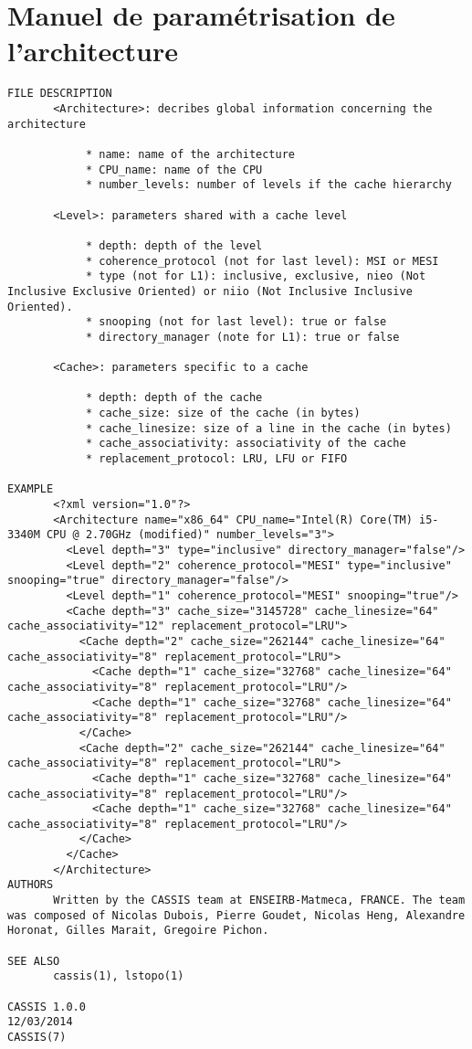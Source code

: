 \section{Manuel de paramétrisation de l'architecture}
\label{manarchi}
\begin{lstlisting}
FILE DESCRIPTION
       <Architecture>: decribes global information concerning the architecture

            * name: name of the architecture
            * CPU_name: name of the CPU
            * number_levels: number of levels if the cache hierarchy

       <Level>: parameters shared with a cache level

            * depth: depth of the level
            * coherence_protocol (not for last level): MSI or MESI
            * type (not for L1): inclusive, exclusive, nieo (Not Inclusive Exclusive Oriented) or niio (Not Inclusive Inclusive Oriented).
            * snooping (not for last level): true or false
            * directory_manager (note for L1): true or false

       <Cache>: parameters specific to a cache

            * depth: depth of the cache
            * cache_size: size of the cache (in bytes)
            * cache_linesize: size of a line in the cache (in bytes)
            * cache_associativity: associativity of the cache
            * replacement_protocol: LRU, LFU or FIFO

EXAMPLE
       <?xml version="1.0"?>
       <Architecture name="x86_64" CPU_name="Intel(R) Core(TM) i5-3340M CPU @ 2.70GHz (modified)" number_levels="3">
         <Level depth="3" type="inclusive" directory_manager="false"/>
         <Level depth="2" coherence_protocol="MESI" type="inclusive" snooping="true" directory_manager="false"/>
         <Level depth="1" coherence_protocol="MESI" snooping="true"/>
         <Cache depth="3" cache_size="3145728" cache_linesize="64" cache_associativity="12" replacement_protocol="LRU">
           <Cache depth="2" cache_size="262144" cache_linesize="64" cache_associativity="8" replacement_protocol="LRU">
             <Cache depth="1" cache_size="32768" cache_linesize="64" cache_associativity="8" replacement_protocol="LRU"/>
             <Cache depth="1" cache_size="32768" cache_linesize="64" cache_associativity="8" replacement_protocol="LRU"/>
           </Cache>
           <Cache depth="2" cache_size="262144" cache_linesize="64" cache_associativity="8" replacement_protocol="LRU">
             <Cache depth="1" cache_size="32768" cache_linesize="64" cache_associativity="8" replacement_protocol="LRU"/>
             <Cache depth="1" cache_size="32768" cache_linesize="64" cache_associativity="8" replacement_protocol="LRU"/>
           </Cache>
         </Cache>
       </Architecture>
AUTHORS
       Written by the CASSIS team at ENSEIRB-Matmeca, FRANCE. The team was composed of Nicolas Dubois, Pierre Goudet, Nicolas Heng, Alexandre Horonat, Gilles Marait, Gregoire Pichon.

SEE ALSO
       cassis(1), lstopo(1)

CASSIS 1.0.0                                                                                                  12/03/2014                                                                                                     CASSIS(7)
\end{lstlisting}

